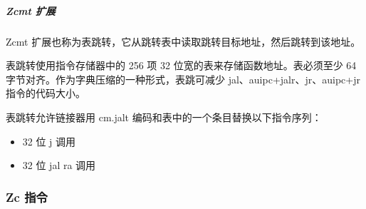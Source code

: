 \documentclass[main\_\_CN.tex]{subfiles}
\begin{document}
\subparagraph{Zcmt 扩展}

Zcmt 扩展也称为表跳转，它从跳转表中读取跳转目标地址，然后跳转到该地址。

表跳转使用指令存储器中的 256 项 32 位宽的表来存储函数地址。表必须至少 64 字节对齐。作为字典压缩的一种形式，表跳可减少 jal、auipc+jalr、jr、auipc+jr 指令的代码大小。

表跳转允许链接器用 cm.jalt 编码和表中的一个条目替换以下指令序列：

\begin{itemize}
    \item 32 位 j 调用
    \item 32 位 jal ra 调用
\end{itemize}

\subsubsection{Zc 指令}
\label{sec:riscvcpu-zc-insn-descr}
\end{document}
